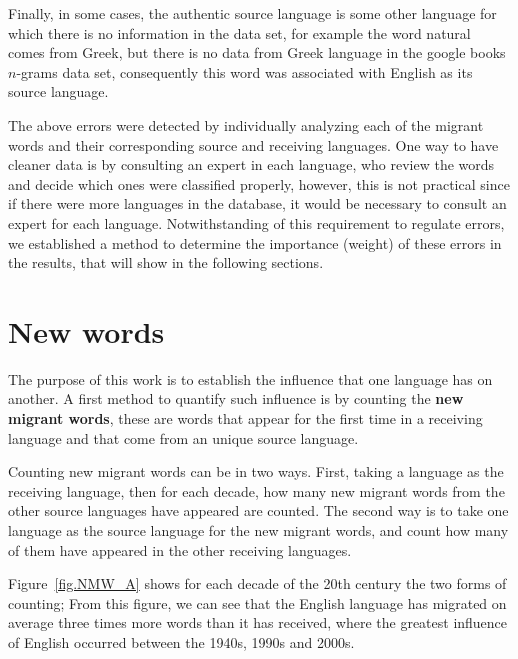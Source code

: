 \documentclass[10pt,letterpaper]{article} %
\begin{document}
	 Finally, in some cases, the authentic source language is some other language for which there is no information in the data set, for example the word  natural comes from Greek, but there is no data from Greek language in the google books $n$-grams data set, consequently this word was associated with English as its source language.
	
	The above errors were detected by individually analyzing each of the migrant words and their corresponding source and receiving languages. One way to have cleaner data is by consulting an expert in each language, who review the words and decide which ones were classified properly, however, this is not practical since if there were more languages in the database, it would be necessary to consult an expert for each language. Notwithstanding of this requirement to  regulate errors, we established a method to determine the importance (weight) of these errors in the results, that will show in the following sections. 
	
	\section*{New words} %
	 
	The purpose of this work is to establish the influence that one language has on another. A first method to quantify such influence is by counting the \textbf{new migrant words}, these are words that appear for the first time in a receiving language and that come from an unique  source language.
	
	Counting new migrant words can be in two ways. First, taking a language as the receiving language, then for each decade, how many new migrant words from the other source languages have appeared are counted. The second way is to take one language as the source language for the new migrant words, and count how many of them have appeared in the other receiving languages.
	
	Figure~\ref{fig.NMW_A} shows for each decade of the 20th century the two forms of counting; From this figure, we can see that the English language has migrated on average three times more words than it has received, where the greatest influence of English occurred between the 1940s, 1990s and 2000s.
	
\end{document}
